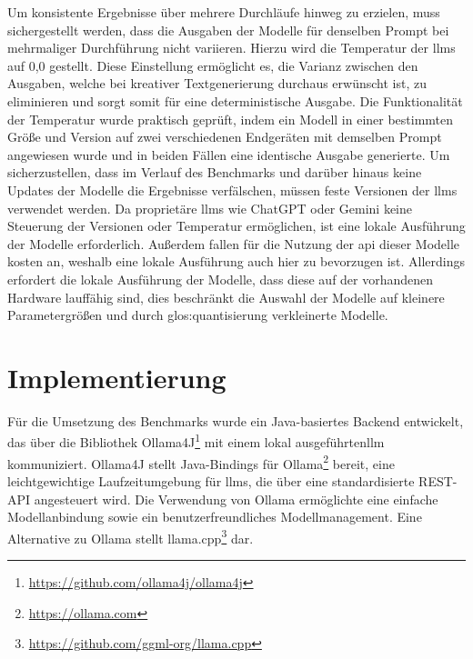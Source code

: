 Um konsistente Ergebnisse über mehrere Durchläufe hinweg zu erzielen, muss sichergestellt werden, dass die Ausgaben der Modelle für denselben Prompt bei mehrmaliger Durchführung nicht variieren.
Hierzu wird die Temperatur der \glspl{llm} auf 0,0 gestellt.
Diese Einstellung ermöglicht es, die Varianz zwischen den Ausgaben, welche bei kreativer Textgenerierung durchaus erwünscht ist, zu eliminieren und sorgt somit für eine deterministische Ausgabe.
Die Funktionalität der Temperatur wurde praktisch geprüft, indem ein Modell in einer bestimmten Größe und Version auf zwei verschiedenen Endgeräten mit demselben Prompt angewiesen wurde und in beiden Fällen eine identische Ausgabe generierte.
Um sicherzustellen, dass im Verlauf des Benchmarks und darüber hinaus keine Updates der Modelle die Ergebnisse verfälschen, müssen feste Versionen der \glspl{llm} verwendet werden.
Da proprietäre \glspl{llm} wie ChatGPT oder Gemini keine Steuerung der Versionen oder Temperatur ermöglichen, ist eine lokale Ausführung der Modelle erforderlich.
Außerdem fallen für die Nutzung der \gls{api} dieser Modelle kosten an, weshalb eine lokale Ausführung auch hier zu bevorzugen ist.
Allerdings erfordert die lokale Ausführung der Modelle, dass diese auf der vorhandenen Hardware lauffähig sind, dies beschränkt die Auswahl der Modelle auf kleinere Parametergrößen und durch \gls{glos:quantisierung} verkleinerte Modelle.


\section{Implementierung}\label{sec:benchmark-implementierung}

Für die Umsetzung des Benchmarks wurde ein Java-basiertes Backend entwickelt, das über die Bibliothek Ollama4J\footnote{\url{https://github.com/ollama4j/ollama4j}} mit einem lokal ausgeführten\gls{llm} kommuniziert.
Ollama4J stellt Java-Bindings für Ollama\footnote{\url{https://ollama.com}} bereit, eine leichtgewichtige Laufzeitumgebung für \glspl{llm}, die über eine standardisierte REST-API angesteuert wird.
Die Verwendung von Ollama ermöglichte eine einfache Modellanbindung sowie ein benutzerfreundliches Modellmanagement.
Eine Alternative zu Ollama stellt llama.cpp\footnote{\url{https://github.com/ggml-org/llama.cpp}} dar.


